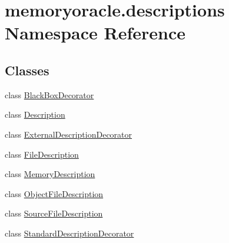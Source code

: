\hypertarget{namespacememoryoracle_1_1descriptions}{}\section{memoryoracle.\+descriptions Namespace Reference}
\label{namespacememoryoracle_1_1descriptions}
\subsection*{Classes}
\begin{DoxyCompactItemize}
\item 
class \hyperlink{classmemoryoracle_1_1descriptions_1_1BlackBoxDecorator}{Black\+Box\+Decorator}
\item 
class \hyperlink{classmemoryoracle_1_1descriptions_1_1Description}{Description}
\item 
class \hyperlink{classmemoryoracle_1_1descriptions_1_1ExternalDescriptionDecorator}{External\+Description\+Decorator}
\item 
class \hyperlink{classmemoryoracle_1_1descriptions_1_1FileDescription}{File\+Description}
\item 
class \hyperlink{classmemoryoracle_1_1descriptions_1_1MemoryDescription}{Memory\+Description}
\item 
class \hyperlink{classmemoryoracle_1_1descriptions_1_1ObjectFileDescription}{Object\+File\+Description}
\item 
class \hyperlink{classmemoryoracle_1_1descriptions_1_1SourceFileDescription}{Source\+File\+Description}
\item 
class \hyperlink{classmemoryoracle_1_1descriptions_1_1StandardDescriptionDecorator}{Standard\+Description\+Decorator}
\end{DoxyCompactItemize}
